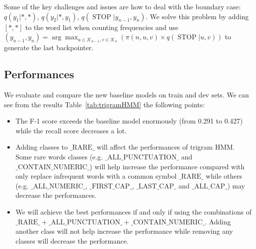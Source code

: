 Some of the key challenges and issues are how to deal with the boundary case: $q\left(y_{1} | *, *\right)$, $q\left(y_{2} | *, y_{1}\right)$, $q\left(\operatorname{STOP} | y_{n-1}, y_{n}\right)$. We solve this problem by adding $[*, *]$ to the word list when counting frequencies and use $\left(y_{n-1}, y_{n}\right)=\arg \max _{u \in \mathcal{K}_{n-1}, v \in \mathcal{K}_{n}}(\pi(n, u, v) \times q(\operatorname{STOP} | u, v))$ to generate the last backpointer.

\subsection{\textbf{Performances}}

We evaluate and compare the new baseline models on train and dev sets. We can see from the results Table~\ref{tab:trigramHMM} the following points:

\begin{itemize}
\item The F-1 score exceeds the baseline model enormously (from 0.291 to 0.427) while the recall score decreases a lot.
\item Adding classes to $\text{\_RARE\_}$ will affect the performances of trigram HMM. Some rare words classes (e.g. $\text{\_ALL\_PUNCTUATION\_}$ and $\text{\_CONTAIN\_NUMERIC\_}$) will help increase the performance compared with only replace infrequent words with a common symbol $\text{\_RARE\_}$ while others (e.g. $\text{\_ALL\_NUMERIC\_}$, $\text{\_FIRST\_CAP\_}$, $\text{\_LAST\_CAP\_}$ and $\text{\_ALL\_CAP\_}$) may decrease the performances.
\item We will achieve the best performances if and only if using the combinations of $\text{\_RARE\_} + \text{\_ALL\_PUNCTUATION\_} + \text{\_CONTAIN\_NUMERIC\_}$. Adding another class will not help increase the performance while removing any classes will decrease the performance.
\end{itemize}

